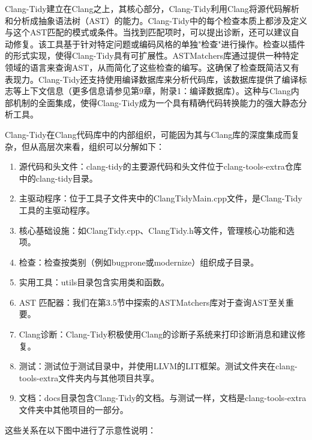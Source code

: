 


Clang-Tidy建立在Clang之上，其核心部分，Clang-Tidy利用Clang将源代码解析和分析成抽象语法树（AST）的能力。Clang-Tidy中的每个检查本质上都涉及定义与这个AST匹配的模式或条件。当找到匹配项时，可以提出诊断，还可以建议自动修复。该工具基于针对特定问题或编码风格的单独"检查"进行操作。检查以插件的形式实现，使得Clang-Tidy具有可扩展性。ASTMatchers库通过提供一种特定领域的语言来查询AST，从而简化了这些检查的编写。这确保了检查既简洁又有表现力。Clang-Tidy还支持使用编译数据库来分析代码库，该数据库提供了编译标志等上下文信息（更多信息请参见第9章，附录1：编译数据库）。这种与Clang内部机制的全面集成，使得Clang-Tidy成为一个具有精确代码转换能力的强大静态分析工具。


Clang-Tidy在Clang代码库中的内部组织，可能因为其与Clang库的深度集成而复杂，但从高层次来看，组织可以分解如下：

\begin{enumerate}
\item
源代码和头文件：clang-tidy的主要源代码和头文件位于clang-tools-extra仓库中的clang-tidy目录。

\item
主驱动程序：位于工具子文件夹中的ClangTidyMain.cpp文件，是Clang-Tidy工具的主驱动程序。

\item
核心基础设施：如ClangTidy.cpp、ClangTidy.h等文件，管理核心功能和选项。

\item
检查：检查按类别（例如bugprone或modernize）组织成子目录。

\item
实用工具：utils目录包含实用类和函数。

\item
AST 匹配器：我们在第3.5节中探索的ASTMatchers库对于查询AST至关重要。

\item
Clang诊断：Clang-Tidy积极使用Clang的诊断子系统来打印诊断消息和建议修复。

\item
测试：测试位于测试目录中，并使用LLVM的LIT框架。测试文件夹在clang-tools-extra文件夹内与其他项目共享。

\item
文档：docs目录包含Clang-Tidy的文档。与测试一样，文档是clang-tools-extra文件夹中其他项目的一部分。
\end{enumerate}

这些关系在以下图中进行了示意性说明：

